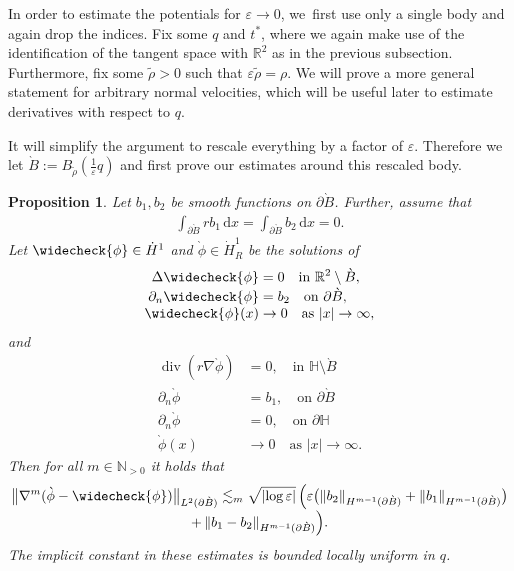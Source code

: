 \documentclass[10pt]{amsart}
\let\epsilon\varepsilon
\let\backslash\setminus
\newtheorem{proposition}[theorem]{Proposition}
\theoremstyle{definition}
\renewcommand{\div}{\operatorname{div}}
\newcommand\R{\mathbb{R}}
\newcommand\N{\mathbb{N}}
\newcommand\norm[1]{\left\lVert #1\right\rVert}
\newcommand\anorm[1]{\lVert #1\rVert}
\newcommand\bnorm[1]{\bigl\lVert #1\bigr\rVert}
\newcommand\eq{=}
\newcommand\dd{\,\mathrm{d}}
\newcommand\dx{\dd x}
\let\chek\widecheck
\let\de\partial
\let\eps\epsilon
\begin{document}
In order to estimate the potentials for $\eps\to 0$, we~first use only a single body and again drop the indices.
Fix some $q$ and $t^*$, where we again make use of the identification of the tangent space with $\R^2$ as in the previous subsection. Furthermore, fix some $\tilde{\rho}>0$ such that $\eps\tilde{\rho}=\rho$.
We will prove a more general statement for arbitrary normal velocities, which will be useful later to estimate derivatives with respect to $q$.

It will simplify the argument to rescale everything by a factor of $\eps$. Therefore we let $\grave{B}:=B_{\tilde{\rho}}(\frac{1}{\eps}q)$ and first prove our estimates around this rescaled body.

\begin{proposition}\label{PotentialGeneral}
Let $b_1,b_2$ be smooth functions on $\de \grave{B}$. Further, assume that
\begin{align*}
\int_{\de \grave{B}}rb_1\dx\eq\int_{\de \grave{B}}b_2\dx\eq0.
\end{align*}
Let $\chek{\phi}\in \dot{H}^1$ and $\grave{\phi}\in \dot{H}_R^1$ be the solutions of
\begin{align}
\Delta\chek{\phi}&\eq0\quad\text{in $\R^2\backslash \grave{B}$},\label{def chek 1}\\[-3pt]
\de_n\chek{\phi}&\eq b_2 \quad\text{on $\de \grave{B}$},\label{def chek 0}\\[-3pt]
\chek{\phi}(x)&\to 0 \quad\text{as $|x|\to\infty$},\label{def chek 2}
\end{align}
and\vspace*{-8pt}\enlargethispage{\baselineskip}
\begin{align*}
\div(r\nabla\grave{\phi})&\eq0,\quad\text{in $\mathbb{H}\backslash \grave{B}$}\\[-3pt]
\de_n\grave{\phi}&\eq b_1, \quad\text{on $\de \grave{B}$}\\[-3pt]
\de_n\grave{\phi}&\eq0, \quad\text{on $\de\mathbb{H}$}\\[-3pt]
\grave{\phi}(x)&\to 0 \quad\text{as $|x|\to\infty$}.
\end{align*}
Then for all $m\in \N_{>0}$ it holds that\vspace*{-5pt}
\begin{multline*}
\bnorm{\nabla^m(\grave{\phi}-\chek{\phi})}_{L^2(\de \grave{B})}\lesssim_m \sqrt{|{\log\eps}|}\,\Bigl(\eps\bigl(\anorm{b_2}_{H^{m-1}(\de \grave{B})}+\norm{b_1}_{H^{m-1}(\de\grave{B})}\bigr)\\[-3pt]
+\norm{b_1-b_2}_{H^{m-1}(\de\grave{B})}\Bigr).
\end{multline*}
The implicit constant in these estimates is bounded locally uniform in $q$.
\end{proposition}
\end{document}
